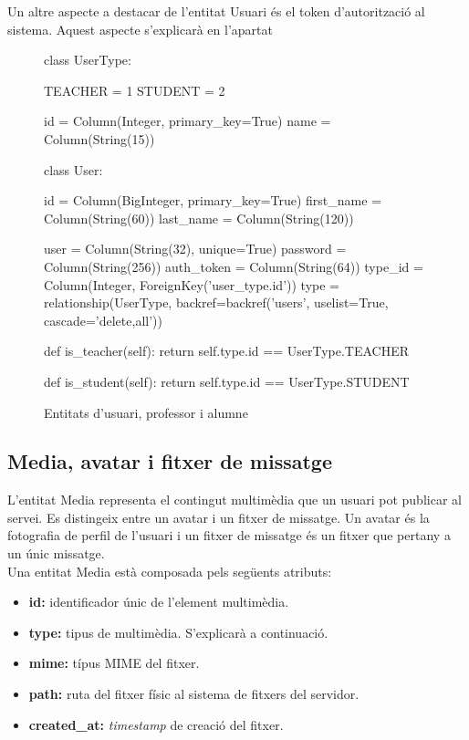 	Un altre aspecte a destacar de l'entitat Usuari és el token d'autorització al sistema. Aquest aspecte s'explicarà en l'apartat %
	

\begin{figure}[here]
	\begin{python}
	class UserType:
	
    	TEACHER = 1
    	STUDENT = 2

    	id = Column(Integer, primary_key=True)
    	name = Column(String(15))
    	
	class User:
	
    	id = Column(BigInteger, primary_key=True)
    	first_name = Column(String(60))
    	last_name = Column(String(120))

    	user = Column(String(32), unique=True)
    	password = Column(String(256))
   		auth_token = Column(String(64))
    	type_id = Column(Integer, ForeignKey('user_type.id'))
    	type = relationship(UserType, backref=backref('users', uselist=True, cascade='delete,all'))
    	
    	def is_teacher(self):
    		return self.type.id == UserType.TEACHER
    		
    	def is_student(self):
    		return self.type.id == UserType.STUDENT
	\end{python}
    \caption{Entitats d'usuari, professor i alumne}
    \label{fig:entitats_usuari}
\end{figure}

	\subsection{Media, avatar i fitxer de missatge} \label{media_avatar_message}
	L'entitat Media representa el contingut multimèdia que un usuari pot publicar al servei. Es distingeix entre un avatar i un fitxer de missatge. Un avatar és la fotografia de perfil de l'usuari i un fitxer de missatge és un fitxer que pertany a un únic missatge. \\
	
	Una entitat Media està composada pels següents atributs:
	
	\begin{itemize}
		\item \textbf{id:} identificador únic de l'element multimèdia.
		\item \textbf{type:} tipus de multimèdia. S'explicarà a continuació.
		\item \textbf{mime:} típus \ac{MIME} del fitxer.
		\item \textbf{path:} ruta del fitxer físic al sistema de fitxers del servidor.
		\item \textbf{created\_at:} \emph{timestamp} de creació del fitxer.
	\end{itemize}
	

